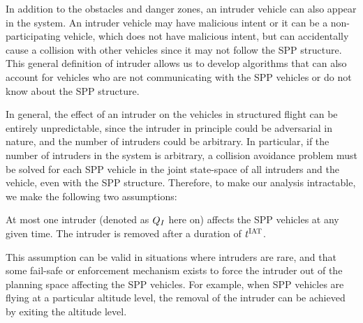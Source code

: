 In addition to the obstacles and danger zones, an intruder vehicle can also appear in the system. An intruder vehicle may have malicious intent or it can be a non-participating vehicle, which does not have malicious intent, but can accidentally cause a collision with other vehicles since it may not follow the SPP structure. This general definition of intruder allows us to develop algorithms that can also account for vehicles who are not communicating with the SPP vehicles or do not know about the SPP structure. 

In general, the effect of an intruder on the vehicles in structured flight can be entirely unpredictable, since the intruder in principle could be adversarial in nature, and the number of intruders could be arbitrary. In particular, if the number of intruders in the system is arbitrary, a collision avoidance problem must be solved for each SPP vehicle in the joint state-space of all intruders and the vehicle, even with the SPP structure. Therefore, to make our analysis intractable, we make the following two assumptions: 
\begin{assumption}
\label{as:avoidOnce}
At most one intruder (denoted as $Q_I$ here on) affects the SPP vehicles at any given time. The intruder is removed after a duration of $t^\text{IAT}$. 
\end{assumption}    
 This assumption can be valid in situations where intruders are rare, and that some fail-safe or enforcement mechanism exists to force the intruder out of the planning space affecting the SPP vehicles. For example, when SPP vehicles are flying at a particular altitude level, the removal of the intruder can be achieved by exiting the altitude level.
 
